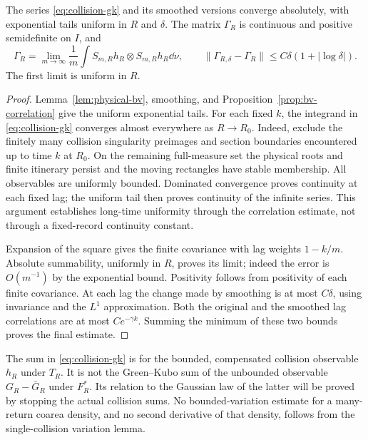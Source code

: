 \begin{theorem}
\label{thm:collision-covariance}
The series \eqref{eq:collision-gk} and its smoothed versions converge
absolutely, with exponential tails uniform in $R$ and $\delta$. The
matrix $\Gamma_R$ is continuous and positive semidefinite on $I$, and
\begin{equation}\label{eq:collision-covariance-limit}
 \Gamma_R=\lim_{m\to\infty}\frac1m
   \int S_{m,R}h_R\otimes S_{m,R}h_R\dd\nu,
 \qquad
 \|\Gamma_{R,\delta}-\Gamma_R\|\le C\delta(1+|\log\delta|).
\end{equation}
The first limit is uniform in $R$.
\end{theorem}
\begin{proof}
Lemma~\ref{lem:physical-bv}, smoothing, and
Proposition~\ref{prop:bv-correlation} give the uniform exponential tails.
For each fixed $k$, the integrand in \eqref{eq:collision-gk} converges
almost everywhere as $R\to R_0$. Indeed, exclude the finitely many
collision singularity preimages and section boundaries encountered up
to time $k$ at $R_0$. On the remaining full-measure set the physical
roots and finite itinerary persist and the moving rectangles have
stable membership. All observables are uniformly bounded. Dominated
convergence proves continuity at each fixed lag; the uniform tail then
proves continuity of the infinite series. This argument establishes
long-time uniformity through the correlation estimate, not through a
fixed-record continuity constant.

Expansion of the square gives the finite covariance with lag weights
$1-k/m$. Absolute summability, uniformly in $R$, proves its limit;
indeed the error is $O(m^{-1})$ by the exponential bound. Positivity
follows from positivity of each finite covariance. At each lag the
change made by smoothing is at most $C\delta$, using invariance and the
$L^1$ approximation. Both the original and the smoothed lag correlations
are at most $Ce^{-\gamma k}$. Summing the minimum of these two bounds
proves the final estimate.
\end{proof}

\begin{remark}\label{rem:collision-gk-scope}
The sum in \eqref{eq:collision-gk} is for the bounded, compensated
collision observable $h_R$ under $T_R$. It is not the Green--Kubo sum
of the unbounded observable $G_R-\bar G_R$ under $F_R^*$. Its relation
to the Gaussian law of the latter will be proved by stopping the actual
collision sums. No bounded-variation estimate for a many-return coarea
density, and no second derivative of that density, follows from the
single-collision variation lemma.
\end{remark}
